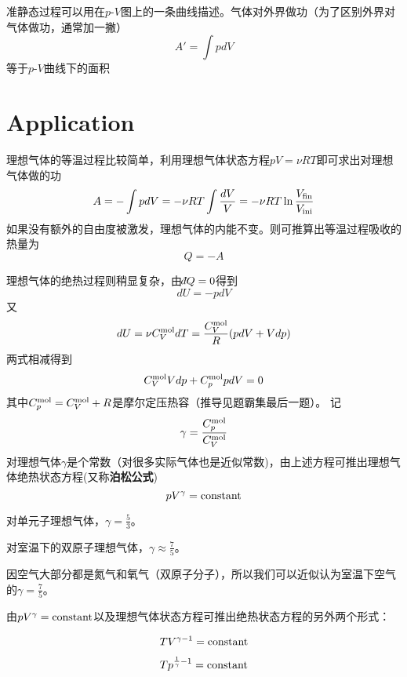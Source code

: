 \documentclass[CJK]{beamer}
\begin{document}
\begin{frame}
\bch
准静态过程可以用在$p$-$V$图上的一条曲线描述。气体对外界做功（为了区别外界对气体做功，通常加一撇）
$$ A' = \int p dV $$
等于$p$-$V$曲线下的面积

\ech
\end{frame}

\section{Application}

\begin{frame}
\bch
理想气体的等温过程比较简单，利用理想气体状态方程$pV = \nu RT$即可求出对理想气体做的功
$$ A = -\int p dV = -\nu R T \int \frac{dV}{V} =- \nu R T\ln\frac{V_{\rm fin}}{V_{\rm ini}}$$
如果没有额外的自由度被激发，理想气体的内能不变。则可推算出等温过程吸收的热量为
$$ Q = - A $$
\ech
\end{frame}


\begin{frame}
\bch
{\small
理想气体的绝热过程则稍显复杂，由$\dbar Q=0$得到
$$ dU = -p dV$$
又$$ dU = \nu C_V^{\rm mol} dT = \frac{C_V^{\rm mol}}{R}(p dV + V dp)$$
两式相减得到
$$ C_V^{\rm mol} Vdp + C_p^{\rm mol} p dV = 0$$
其中$C_p^{\rm mol} = C_V^{\rm mol} + R$是摩尔定压热容（推导见题霸集最后一题）。
记$$\gamma = \frac{C_p^{\rm mol}}{C_V^{\rm mol}}$$
对理想气体$\gamma$是个常数（对很多实际气体也是近似常数)，由上述方程可推出{\blue 理想气体绝热状态方程}(又称{\bf 泊松公式})
{\blue 
$$p V^\gamma = \mathrm{constant}$$}
}
\ech
\end{frame}


\begin{frame}
\bch
{\small
对单元子理想气体，$\gamma = \frac{5}{3}$。

\skipline

对室温下的双原子理想气体，$\gamma \approx \frac{7}{5}$。

\skipline

因空气大部分都是氮气和氧气（双原子分子），所以我们可以近似认为室温下空气的$\gamma = \frac{7}{5}$。
}

由$pV^\gamma = \mathrm{constant} $以及理想气体状态方程可推出绝热状态方程的另外两个形式：

$$ TV^{\gamma-1} = \mathrm{constant}$$

$$T p^{\frac{1}{\gamma}-1} = \mathrm{constant} $$
\ech
\end{frame}
\end{document}
